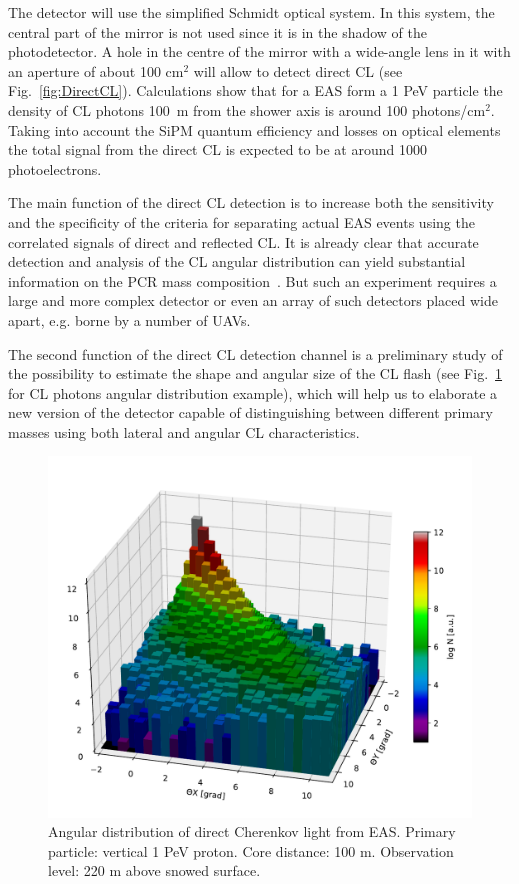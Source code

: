 \documentclass[a4paper,11pt]{article}
\begin{document}
The detector will use the simplified Schmidt optical system. In this system, the central part of the mirror is not used since it is in the shadow of the photodetector. A hole in the centre of the mirror with a wide-angle lens in it with an aperture of about 100 cm$^2$ will allow to detect direct CL (see Fig.~\ref{fig:DirectCL}). Calculations show that for a EAS form a 1 PeV particle the density of CL photons 100~m from the shower axis is around 100 photons/cm$^2$. Taking into account the SiPM quantum efficiency and losses on optical elements the total signal from the direct CL is expected to be at around 1000 photoelectrons.

The main function of the direct CL detection is to increase both the sensitivity and the specificity of the criteria for separating actual EAS events using the correlated signals of direct and reflected CL. It is already clear that accurate detection and analysis of the CL angular distribution can yield substantial information on the PCR mass composition~\cite{Gal18a,Gal18b}. But such an experiment requires a large and more complex detector or even an array of such detectors placed wide apart, e.g. borne by a number of UAVs.

The second function of the direct CL detection channel is a preliminary study of the possibility to estimate the shape and angular size of the CL flash (see Fig.~\ref{fig:CLangular} for CL photons angular distribution example), which will help us to elaborate a new version of the detector capable of distinguishing between different primary masses using both lateral and angular CL characteristics.

\begin{figure}[t]
\centering %
\includegraphics[height=.4\textheight]{ang_distr.pdf}
\caption{Angular distribution of direct Cherenkov light from EAS. Primary particle: vertical 1 PeV proton. Core distance: 100 m. Observation level: 220 m above snowed surface.}
\label{fig:CLangular}
\end{figure}
\end{document}
